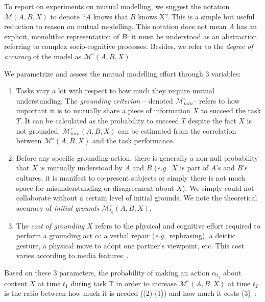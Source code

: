 \documentclass[natbib]{svjour3}
\newcommand{\eg}{{\textit{e.g.\ }}}
\newcommand{\model}[3]{{$\mathcal{M}(#1, #2, #3)$}}
\newcommand{\Model}[3]{{$\mathcal{M}^{\circ}(#1, #2, #3)$}}
\newcommand{\groundingcriterion}{{$\mathcal{M}^{\circ}_{min}$}}
\begin{document}
To report on experiments on mutual modelling, we suggest the notation
\model{A}{B}{X} to denote ``$A$ knows that $B$ knows X''. This is a simple but
useful reduction to reason on mutual modelling. This notation does not mean $A$
has an explicit, monolithic representation of $B$: it must be understood as an
abstraction referring to complex socio-cognitive processes. Besides, we refer to
the \emph{degree of accuracy} of the model as \Model{A}{B}{X}.

We parametrize and assess the mutual modelling effort through 3 variables:

\begin{enumerate}

    \item Tasks vary a lot with respect to how much they require mutual
        understanding.  The \emph{grounding criterion} -- denoted
        \groundingcriterion -- refers to how important it is to mutually share a
        piece of information $X$ to succeed the task $T$. It can be calculated as
        the probability to succeed $T$ despite the fact $X$ is not grounded.
        $\mathcal{M}^{\circ}_{min}(A,B,X)$ can be estimated from the correlation
        between \Model{A}{B}{X} and the task performance. 

    \item Before any specific grounding action, there is generally a non-null
        probability that $X$ is mutually understood by $A$ and $B$ (\eg $X$ is
        part of $A$'s and $B$'s cultures, it is manifest to co-present subjects
        or simply there is not much space for misunderstanding or disagreement
        about $X$). We simply could not collaborate without a certain level of
        initial grounds. We note the theoretical accuracy of \emph{initial
        grounds} $\mathcal{M}^{\circ}_{t_0}(A,B,X)$.

    \item The \emph{cost of grounding} $X$ refers to the physical and cognitive
        effort required to perform a grounding act $\alpha$: a verbal repair
        (\eg rephrasing), a deictic gesture, a physical move to adopt one
        partner's viewpoint, etc. This cost varies according to media
        features~\citep{clark1991grounding}.

\end{enumerate}

Based on these 3 parameters, the probability of making an action $\alpha_{t_1}$ about
content $X$ at time $t_1$ during task T in order to increase \Model{A}{B}{X}
at time $t_2$ is the ratio between how much it is needed  ((2)-(1)) and how much it
costs (3)~\citep{traum1996miscommunication}:
\end{document}
